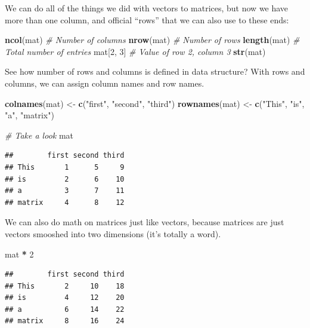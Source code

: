\documentclass[
]{book}
\newenvironment{Shaded}{\begin{snugshade}}{\end{snugshade}}
\newcommand{\CommentTok}[1]{\textcolor[rgb]{0.56,0.35,0.01}{\textit{#1}}}
\newcommand{\DecValTok}[1]{\textcolor[rgb]{0.00,0.00,0.81}{#1}}
\newcommand{\KeywordTok}[1]{\textcolor[rgb]{0.13,0.29,0.53}{\textbf{#1}}}
\newcommand{\NormalTok}[1]{#1}
\newcommand{\OperatorTok}[1]{\textcolor[rgb]{0.81,0.36,0.00}{\textbf{#1}}}
\newcommand{\StringTok}[1]{\textcolor[rgb]{0.31,0.60,0.02}{#1}}
\begin{document}
We can do all of the things we did with vectors to matrices, but now we have more than one column, and official ``rows'' that we can also use to these ends:

\begin{Shaded}
\begin{Highlighting}[]
\KeywordTok{ncol}\NormalTok{(mat) }\CommentTok{# Number of columns}
\KeywordTok{nrow}\NormalTok{(mat) }\CommentTok{# Number of rows}
\KeywordTok{length}\NormalTok{(mat) }\CommentTok{# Total number of entries}
\NormalTok{mat[}\DecValTok{2}\NormalTok{, }\DecValTok{3}\NormalTok{] }\CommentTok{# Value of row 2, column 3}
\KeywordTok{str}\NormalTok{(mat)}
\end{Highlighting}
\end{Shaded}

See how number of rows and columns is defined in data structure? With rows and columns, we can assign column names and row names.

\begin{Shaded}
\begin{Highlighting}[]
\KeywordTok{colnames}\NormalTok{(mat) <-}\StringTok{ }\KeywordTok{c}\NormalTok{(}\StringTok{"first"}\NormalTok{, }\StringTok{"second"}\NormalTok{, }\StringTok{"third"}\NormalTok{)}
\KeywordTok{rownames}\NormalTok{(mat) <-}\StringTok{ }\KeywordTok{c}\NormalTok{(}\StringTok{"This"}\NormalTok{, }\StringTok{"is"}\NormalTok{, }\StringTok{"a"}\NormalTok{, }\StringTok{"matrix"}\NormalTok{)}

\CommentTok{# Take a look}
\NormalTok{mat}
\end{Highlighting}
\end{Shaded}

\begin{verbatim}
##        first second third
## This       1      5     9
## is         2      6    10
## a          3      7    11
## matrix     4      8    12
\end{verbatim}

We can also do math on matrices just like vectors, because matrices are just vectors smooshed into two dimensions (it's totally a word).

\begin{Shaded}
\begin{Highlighting}[]
\NormalTok{mat }\OperatorTok{*}\StringTok{ }\DecValTok{2}
\end{Highlighting}
\end{Shaded}

\begin{verbatim}
##        first second third
## This       2     10    18
## is         4     12    20
## a          6     14    22
## matrix     8     16    24
\end{verbatim}
\end{document}
